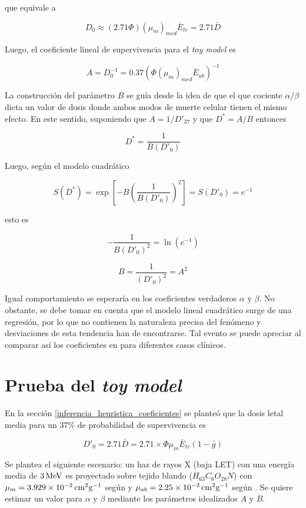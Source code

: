 \documentclass[12pt,letterpaper, oneside]{book}
\begin{document}
	\noindent que equivale a
	
	$$D_0\approx (2.71\Phi)(\mu_m)_{med}\bar{E}_{tr}=2.71\bar{D}$$
	
	Luego, el coeficiente lineal de supervivencia para el \textit{toy model} es
	
	\begin{equation}
		A = D_0^{-1} = 0.37\left(\Phi (\mu_m)_{med} \bar{E}_{ab}\right)^{-1}
	\end{equation}
	
	La construcción del parámetro $B$ se guía desde la idea de que el que cociente $\alpha/\beta$ dicta un valor de dosis donde ambos modos de muerte celular tienen el mismo efecto. En este sentido, suponiendo que $A=1/D'_{37}$ y que $D^{*}=A/B$ entonces
	
	$$D^{*}=\frac{1}{B(D'_0)}$$
	
	Luego, según el modelo cuadrático 
	
	$$S(D^{*})=\exp\left[-B\left(\frac{1}{B(D'_0)}\right)^2\right]=S(D'_0)=e^{-1}$$
	
	\noindent esto es
	
	$$-\frac{1}{B(D'_0)^2}=\ln(e^{-1})$$
	
	$$B=\frac{1}{(D'_0)^2}=A^2$$
	
	Igual comportamiento se esperaría en los coeficientes verdaderos $\alpha$ y $\beta$. No obstante, se debe tomar en cuenta que el modelo lineal cuadrático surge de una regresión, por lo que no contienen la naturaleza precisa del fenómeno y desviaciones de esta tendencia han de encontrarse. Tal evento se puede apreciar al comparar así los coeficientes en \cite{Leeuwen.2018} para diferentes casos clínicos. 

	\chapter{Prueba del \textit{toy model}}
	En la sección \ref{inferencia_heuristica_coeficientes} se planteó que la dosis letal media para un $37\%$ de probabilidad de supervivencia es
	
	
	$$D'_0=2.71\bar{D}=2.71\times \Phi \mu_{m} \bar{E}_{tr}(1-\bar{g})$$
	
	Se plantea el siguiente escenario: un haz de rayos X (baja LET) con una energía media de $\unit[3]{MeV}$\cite{Podgorsak.2016} es proyectado sobre tejido blando ($H_{63}C_6O_{28}N$)\cite{Alburiahi.2019} con $\mu_m=\unit[3.929\times10^{-2}]{cm^2g^{-1}}$ según \cite{NIST.2017} y $\mu_{ab}=\unit[2.25\times 10^{-2}]{cm^2g^{-1}}$ según \cite{NIST.2017}. Se quiere estimar un valor para $\alpha$ y $\beta$ mediante los parámetros idealizados $A$ y $B$. 
	
\end{document}
